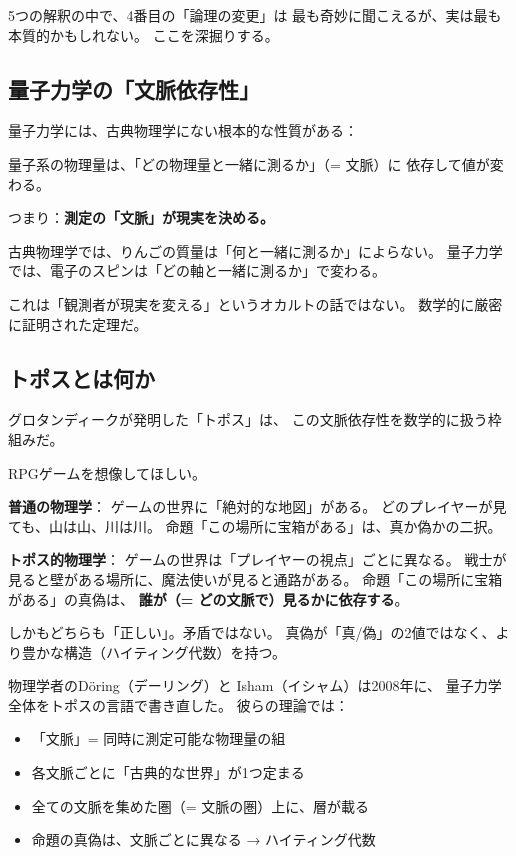 \documentclass[12pt,a4paper]{article}
\begin{document}
5つの解釈の中で、4番目の「論理の変更」は
最も奇妙に聞こえるが、実は最も本質的かもしれない。
ここを深掘りする。

\subsection{量子力学の「文脈依存性」}

量子力学には、古典物理学にない根本的な性質がある：

\begin{keybox}
量子系の物理量は、「どの物理量と一緒に測るか」（= 文脈）に
依存して値が変わる。

つまり：\textbf{測定の「文脈」が現実を決める。}

古典物理学では、りんごの質量は「何と一緒に測るか」によらない。
量子力学では、電子のスピンは「どの軸と一緒に測るか」で変わる。
\end{keybox}

これは「観測者が現実を変える」というオカルトの話ではない。
数学的に厳密に証明された定理だ。

\subsection{トポスとは何か}

グロタンディークが発明した「トポス」は、
この文脈依存性を数学的に扱う枠組みだ。

\begin{analogybox}
RPGゲームを想像してほしい。

\textbf{普通の物理学}：
ゲームの世界に「絶対的な地図」がある。
どのプレイヤーが見ても、山は山、川は川。
命題「この場所に宝箱がある」は、真か偽かの二択。

\textbf{トポス的物理学}：
ゲームの世界は「プレイヤーの視点」ごとに異なる。
戦士が見ると壁がある場所に、魔法使いが見ると通路がある。
命題「この場所に宝箱がある」の真偽は、
\textbf{誰が（= どの文脈で）見るかに依存する}。

しかもどちらも「正しい」。矛盾ではない。
真偽が「真/偽」の2値ではなく、より豊かな構造（ハイティング代数）を持つ。
\end{analogybox}

物理学者のDöring（デーリング）と Isham（イシャム）は2008年に、
量子力学全体をトポスの言語で書き直した。
彼らの理論では：

\begin{itemize}
\item 「文脈」= 同時に測定可能な物理量の組
\item 各文脈ごとに「古典的な世界」が1つ定まる
\item 全ての文脈を集めた圏（= 文脈の圏）上に、層が載る
\item 命題の真偽は、文脈ごとに異なる → ハイティング代数
\end{itemize}
\end{document}
